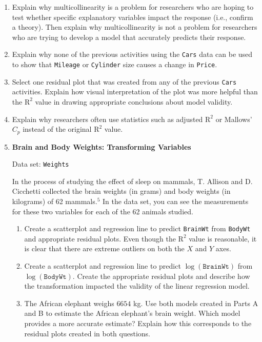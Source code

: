 \documentclass[
]{book}
\begin{document}
\begin{enumerate}
  \item Explain why multicollinearity is a problem for researchers who are hoping to test whether specific explanatory variables impact the response (i.e., confirm a theory). Then explain why multicollinearity is not a problem for researchers who are trying to develop a model that accurately predicts their response.

  \item Explain why none of the previous activities using the \texttt{Cars} data can be used to show that \texttt{Mileage} or \texttt{Cylinder} size causes a change in \texttt{Price}.

  \item Select one residual plot that was created from any of the previous \texttt{Cars} activities. Explain how visual interpretation of the plot was more helpful than the $\mathrm{R}^2$ value in drawing appropriate conclusions about model validity.

  \item Explain why researchers often use statistics such as adjusted $\mathrm{R}^2$ or Mallows’ $C_p$ instead of the original $\mathrm{R}^2$ value.

  \item \textbf{Brain and Body Weights: Transforming Variables}

Data set: \texttt{Weights}

In the process of studying the effect of sleep on mammals, T. Allison and D. Cicchetti collected the brain weights (in grams) and body weights (in kilograms) of 62 mammals.$^5$ In the data set, you can see the measurements for these two variables for each of the 62 animals studied.

  \begin{enumerate}
    \item Create a scatterplot and regression line to predict \texttt{BrainWt} from \texttt{BodyWt} and appropriate residual plots. Even though the $\mathrm{R}^2$ value is reasonable, it is clear that there are extreme outliers on both the $X$ and $Y$ axes.
      \item Create a scatterplot and regression line to predict $\log(\texttt{BrainWt})$ from $\log(\texttt{BodyWt})$. Create the appropriate residual plots and describe how the transformation impacted the validity of the linear regression model.
      \item The African elephant weighs $6654$ kg. Use both models created in Parts A and B to estimate the African elephant’s brain weight. Which model provides a more accurate estimate? Explain how this corresponds to the residual plots created in both questions.
    \end{enumerate}


\end{enumerate}
\end{document}
